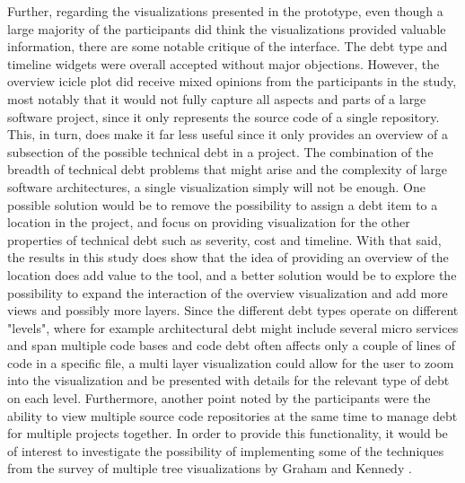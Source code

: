 Further, regarding the visualizations presented in the prototype, even though a large majority of the participants did think the visualizations provided valuable information, there are some notable critique of the interface.
The debt type and timeline widgets were overall accepted without major objections.
However, the overview icicle plot did receive mixed opinions from the participants in the study, most notably that it would not fully capture all aspects and parts of a large software project, since it only represents the source code of a single repository.
This, in turn, does make it far less useful since it only provides an overview of a subsection of the possible technical debt in a project.
The combination of the breadth of technical debt problems that might arise and the complexity of large software architectures, a single visualization simply will not be enough.
One possible solution would be to remove the possibility to assign a debt item to a location in the project, and focus on providing visualization for the other properties of technical debt such as severity, cost and timeline.
With that said, the results in this study does show that the idea of providing an overview of the location does add value to the tool, and a better solution would be to explore the possibility to expand the interaction of the overview visualization and add more views and possibly more layers.
Since the different debt types operate on different "levels", where for example architectural debt might include several micro services and span multiple code bases and code debt often affects only a couple of lines of code in a specific file, a multi layer visualization could allow for the user to zoom into the visualization and be presented with details for the relevant type of debt on each level.
Furthermore, another point noted by the participants were the ability to view multiple source code repositories at the same time to manage debt for multiple projects together.
In order to provide this functionality, it would be of interest to investigate the possibility of implementing some of the techniques from the survey of multiple tree visualizations by Graham and Kennedy \cite{graham_survey_2010}.


